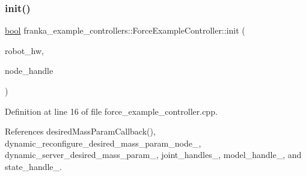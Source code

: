 \subsubsection{\texorpdfstring{init()}{init()}}
{\footnotesize\ttfamily \hyperlink{classbool}{bool} franka\+\_\+example\+\_\+controllers\+::\+Force\+Example\+Controller\+::init (\begin{DoxyParamCaption}\item[{hardware\+\_\+interface\+::\+Robot\+HW $\ast$}]{robot\+\_\+hw,  }\item[{ros\+::\+Node\+Handle \&}]{node\+\_\+handle }\end{DoxyParamCaption})\hspace{0.3cm}{\ttfamily [override]}}



Definition at line 16 of file force\+\_\+example\+\_\+controller.\+cpp.



References desired\+Mass\+Param\+Callback(), dynamic\+\_\+reconfigure\+\_\+desired\+\_\+mass\+\_\+param\+\_\+node\+\_\+, dynamic\+\_\+server\+\_\+desired\+\_\+mass\+\_\+param\+\_\+, joint\+\_\+handles\+\_\+, model\+\_\+handle\+\_\+, and state\+\_\+handle\+\_\+.


